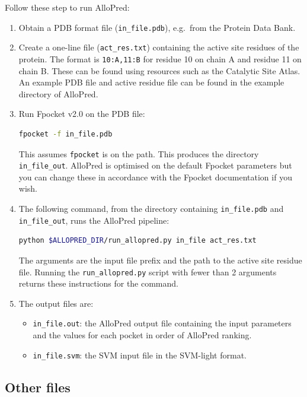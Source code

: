 Follow these step to run AlloPred:

\begin{enumerate}
\item Obtain a PDB format file (\verb|in_file.pdb|), e.g.\ from the Protein Data Bank.

\item Create a one-line file (\verb|act_res.txt|) containing the active site residues of the protein. The format is \verb|10:A,11:B| for residue 10 on chain A and residue 11 on chain B. These can be found using resources such as the Catalytic Site Atlas. An example PDB file and active residue file can be found in the example directory of AlloPred.

\item Run Fpocket v2.0 on the PDB file:
\begin{lstlisting}[language=bash]
    fpocket -f in_file.pdb
\end{lstlisting}
This assumes \verb|fpocket| is on the path. This produces the directory \verb|in_file_out|. AlloPred is optimised on the default Fpocket parameters but you can change these in accordance with the Fpocket documentation if you wish.

\item The following command, from the directory containing \verb|in_file.pdb| and \verb|in_file_out|, runs the AlloPred pipeline:
\begin{lstlisting}[language=bash]
    python $ALLOPRED_DIR/run_allopred.py in_file act_res.txt
\end{lstlisting}
The arguments are the input file prefix and the path to the active site residue file. Running the \verb|run_allopred.py| script with fewer than 2 arguments returns these instructions for the command.

\item The output files are:
    \begin{itemize}
    \item \verb|in_file.out|: the AlloPred output file containing the input parameters and the values for each pocket in order of AlloPred ranking.
    \item \verb|in_file.svm|: the SVM input file in the SVM-light format.
    \end{itemize}
\end{enumerate}


\subsection*{Other files}

